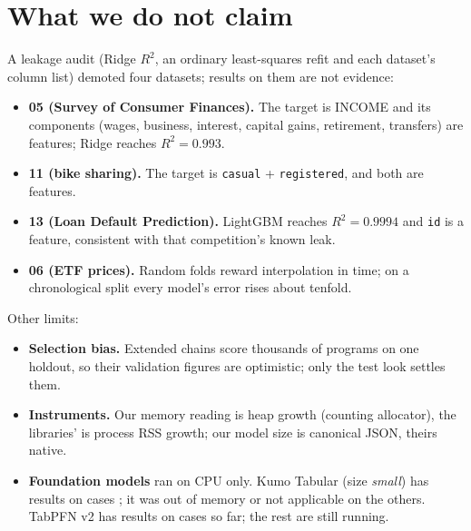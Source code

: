 \documentclass[10.5pt]{article}
\begin{document}
\section{What we do not claim}\label{sec:notclaimed}
A leakage audit (Ridge $R^2$, an ordinary least-squares refit and each dataset's column list) demoted four datasets; results on them are not evidence:
\begin{itemize}
\item \textbf{05 (Survey of Consumer Finances).} The target is INCOME and its components (wages, business, interest, capital gains, retirement,
transfers) are features; Ridge reaches $R^2=0.993$.
\item \textbf{11 (bike sharing).} The target is \texttt{casual} + \texttt{registered}, and both are features.
\item \textbf{13 (Loan Default Prediction).} LightGBM reaches $R^2=0.9994$ and \texttt{id} is a feature, consistent with that competition's known leak.
\item \textbf{06 (ETF prices).} Random folds reward interpolation in time; on a chronological split every model's error rises about tenfold.
\end{itemize}
Other limits:
\begin{itemize}
\item \textbf{Selection bias.} Extended chains score thousands of programs on one holdout, so their validation figures are optimistic; only the test look settles them.
\item \textbf{Instruments.} Our memory reading is heap growth (counting allocator), the libraries' is process RSS growth; our model size is canonical JSON, theirs native.
\item \textbf{Foundation models} ran on CPU only. Kumo Tabular (size \emph{small}) has results on cases \KumoCases{}; it was out of memory or not applicable on the others.
TabPFN v2 has results on cases \TabPFNCases{} so far; the rest are still running.
\end{itemize}

\end{document}
